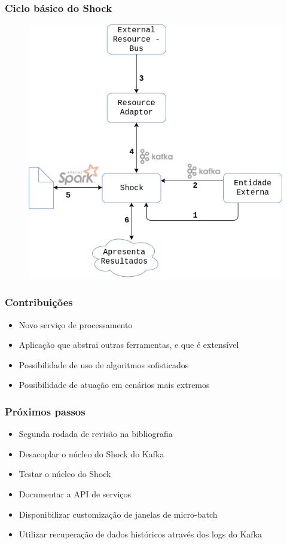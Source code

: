 \documentclass{beamer}
\begin{document}
  \begin{frame}
      \frametitle{Ciclo básico do Shock}
          \begin{figure}
              \includegraphics[scale=0.3]{figures/shock.png}
          \end{figure}
  \end{frame}

  \begin{frame}
      \frametitle{Contribuições}
      \begin{itemize}
          \item Novo serviço de processamento
          \item Aplicação que abstrai outras ferramentas, e que é extensível
          \item Possibilidade de uso de algoritmos sofisticados
          \item Possibilidade de atuação em cenários mais extremos
      \end{itemize}
  \end{frame}

  \begin{frame}
      \frametitle{Próximos passos}
      \begin{itemize}
          \item Segunda rodada de revisão na bibliografia
          \item Desacoplar o núcleo do Shock do Kafka
          \item Testar o núcleo do Shock
          \item Documentar a API de serviços
          \item Disponibilizar customização de janelas de micro-batch
          \item Utilizar recuperação de dados históricos através dos logs do Kafka
      \end{itemize}
  \end{frame}
\end{document}
